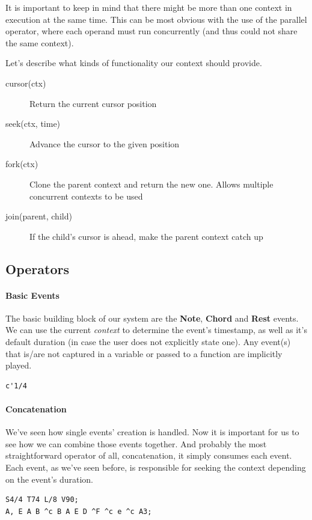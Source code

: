 \documentclass[a4paper,UKenglish,cleveref, autoref]{oasics-v2019}
\begin{document}
It is important to keep in mind that there might be more than one context in execution at the same time. This can be most obvious with the use of the parallel operator, where each operand must run concurrently (and thus could not share the same context).

Let's describe what kinds of functionality our context should provide.

\begin{description}
    \item[cursor(ctx)] Return the current cursor position
    \item[seek(ctx, time)] Advance the cursor to the given position
    \item[fork(ctx)] Clone the parent context and return the new one. Allows multiple concurrent contexts to be used
    \item[join(parent, child)] If the child's cursor is ahead, make the parent context catch up
\end{description}

\subsection{Operators}

\paragraph*{Basic Events}
The basic building block of our system are the \textbf{Note}, \textbf{Chord} and \textbf{Rest} events. We can use the current \textit{context} to determine the event's timestamp, as well as it's default duration (in case the user does not explicitly state one). Any event(s) that is/are not captured in a variable or passed to a function are implicitly played.

\begin{lstlisting}[caption={Creating a Note Event},label=list:3,captionpos=t,abovecaptionskip=-\medskipamount]
c'1/4
\end{lstlisting}

\paragraph*{Concatenation}
We've seen how single events' creation is handled. Now it is important for us to see how we can combine those events together. And probably the most straightforward operator of all, concatenation, it simply consumes each event. Each event, as we've seen before, is responsible for seeking the context depending on the event's duration.
\begin{lstlisting}[caption={Snippet of Wet Hands by C418},label=list:4,captionpos=t,abovecaptionskip=-\medskipamount]
S4/4 T74 L/8 V90;
A, E A B ^c B A E D ^F ^c e ^c A3;
\end{lstlisting}
\end{document}
